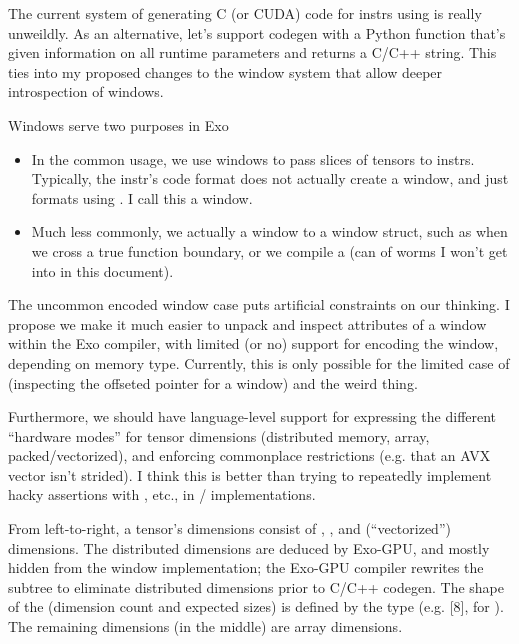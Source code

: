 \filbreak
{}

The current system of generating C (or CUDA) code for instrs using  is really unweildly.
As an alternative, let's support codegen with a Python function that's given information on all runtime parameters and returns a C/C++ string.
This ties into my proposed changes to the window system that allow deeper introspection of windows.

\newpage
{}

Windows serve two purposes in Exo
\begin{itemize}
 \item In the common usage, we use windows to pass slices of tensors to instrs.
 Typically, the instr's code format does not actually create a window, and just formats using .
 I call this a  window.
 \item Much less commonly, we actually  a window to a window struct, such as when we cross a true function boundary, or we compile a  (can of worms I won't get into in this document).
\end{itemize}
\filbreak
The uncommon encoded window case puts artificial constraints on our thinking.
I propose we make it much easier to unpack and inspect attributes of a window within the Exo compiler, with limited (or no) support for encoding the window, depending on memory type.
Currently, this is only possible for the limited case of  (inspecting the offseted pointer for a window) and the weird  thing.

\filbreak
Furthermore, we should have language-level support for expressing the different ``hardware modes'' for tensor dimensions (distributed memory, array, packed/vectorized), and enforcing commonplace restrictions (e.g. that an AVX vector isn't strided).
I think this is better than trying to repeatedly implement hacky assertions with , etc., in / implementations.

\filbreak
{}

From left-to-right, a tensor's dimensions consist of , , and  (``vectorized'') dimensions.
The distributed dimensions are deduced by Exo-GPU, and mostly hidden from the window implementation; the Exo-GPU compiler rewrites the subtree to eliminate distributed dimensions prior to C/C++ codegen.
The shape of the  (dimension count and expected sizes) is defined by the  type (e.g. [8], for ).
The remaining dimensions (in the middle) are array dimensions.

